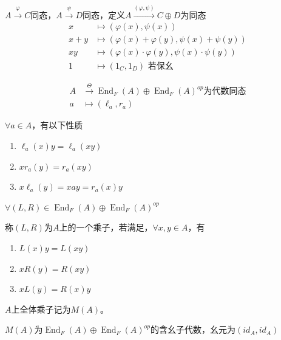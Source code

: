\documentclass[lang=cn,a4paper,newtx,section]{elegantbook}
\begin{document}
$A \xrightarrow{\varphi} C$同态，$A \xrightarrow{\psi} D$同态，定义$A \xrightarrow{(\varphi, \psi)} C \oplus D$为同态
\begin{align*}
  x &\longmapsto (\varphi(x), \psi(x)) \\
  x + y &\longmapsto (\varphi(x) + \varphi(y), \psi(x) + \psi(y)) \\
  xy &\longmapsto (\varphi(x) \cdot \varphi(y), \psi(x) \cdot \psi(y)) \\
  1 &\longmapsto (1_C, 1_D) \text{ 若保幺}
\end{align*}

\begin{definition}
   \begin{equation*}
    \begin{aligned}
      A &\xrightarrow{\Theta} \operatorname{End}_F(A) \oplus \operatorname{End}_F(A)^{op} \text{为代数同态}\\
      a &\longmapsto (\ell_a, r_a)
    \end{aligned}
  \end{equation*}
\end{definition}

\begin{proposition}
  $\forall a \in A$，有以下性质
  \begin{enumerate}
    \item $\ell_a(x)y = \ell_a(xy)$
    \item $x r_a(y) = r_a(xy)$
    \item $x \ell_a(y) = x ay = r_a(x) y$
  \end{enumerate}
\end{proposition}

\begin{definition}
  $\forall (L, R) \in \operatorname{End}_F(A) \oplus \operatorname{End}_F(A)^{op}$
  
  称$(L, R)$为$A$上的一个乘子，若满足，$\forall x, y \in A$，有
  \begin{enumerate}
    \item $L(x)y = L(xy)$
    \item $x R(y) = R(xy)$
    \item $x L(y) = R(x)y$
  \end{enumerate}
  
  $A$上全体乘子记为$M(A)$。
\end{definition}

\begin{proposition}
  $M(A)$为$\operatorname{End}_F(A) \oplus \operatorname{End}_F(A)^{op}$的含幺子代数，幺元为$(id_A, id_A)$
\end{proposition}
\end{document}
